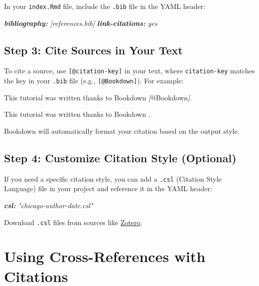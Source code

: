 \documentclass[
]{book}
\newenvironment{Shaded}{\begin{snugshade}}{\end{snugshade}}
\newcommand{\AnnotationTok}[1]{\textcolor[rgb]{0.56,0.35,0.01}{\textbf{\textit{#1}}}}
\newcommand{\CommentTok}[1]{\textcolor[rgb]{0.56,0.35,0.01}{\textit{#1}}}
\newcommand{\NormalTok}[1]{#1}
\newcommand{\OtherTok}[1]{\textcolor[rgb]{0.56,0.35,0.01}{#1}}
\theoremstyle{definition}
\theoremstyle{definition}
\theoremstyle{definition}
\theoremstyle{definition}
\theoremstyle{remark}
\begin{document}
In your \texttt{index.Rmd} file, include the \texttt{.bib} file in the YAML header:

\begin{Shaded}
\begin{Highlighting}[]
\AnnotationTok{bibliography:}\CommentTok{ [references.bib]}
\AnnotationTok{link{-}citations:}\CommentTok{ yes}
\end{Highlighting}
\end{Shaded}

\subsection{Step 3: Cite Sources in Your Text}\label{step-3-cite-sources-in-your-text}

To cite a source, use \texttt{{[}@citation-key{]}} in your text, where \texttt{citation-key} matches the key in your \texttt{.bib} file (e.g., \texttt{{[}@Bookdown{]}}). For example:

\begin{Shaded}
\begin{Highlighting}[]
\NormalTok{This tutorial was written thanks to Bookdown }\CommentTok{[}\OtherTok{@Bookdown}\CommentTok{]}\NormalTok{.}
\end{Highlighting}
\end{Shaded}

This tutorial was written thanks to Bookdown \citep{Bookdown}.

Bookdown will automatically format your citation based on the output style.

\subsection{Step 4: Customize Citation Style (Optional)}\label{step-4-customize-citation-style-optional}

If you need a specific citation style, you can add a \texttt{.csl} (Citation Style Language) file in your project and reference it in the YAML header:

\begin{Shaded}
\begin{Highlighting}[]
\AnnotationTok{csl:}\CommentTok{ "chicago{-}author{-}date.csl"}
\end{Highlighting}
\end{Shaded}

Download \texttt{.csl} files from sources like \href{https://www.zotero.org/styles}{Zotero}.

\section{Using Cross-References with Citations}\label{using-cross-references-with-citations}
\end{document}
